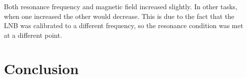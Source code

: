 \documentclass{article}
\begin{document}
Both resonance frequency and magnetic field increased slightly. In other tasks, when one increased the other would decrease. This is due to the fact that the LNB was calibrated to a different frequency, so the resonance condition was met at a different point.

\pagebreak{}

\section{Conclusion}

\pagebreak{}

\begin{appendices}


\end{appendices}

\pagebreak{}

 
 
\end{document}
